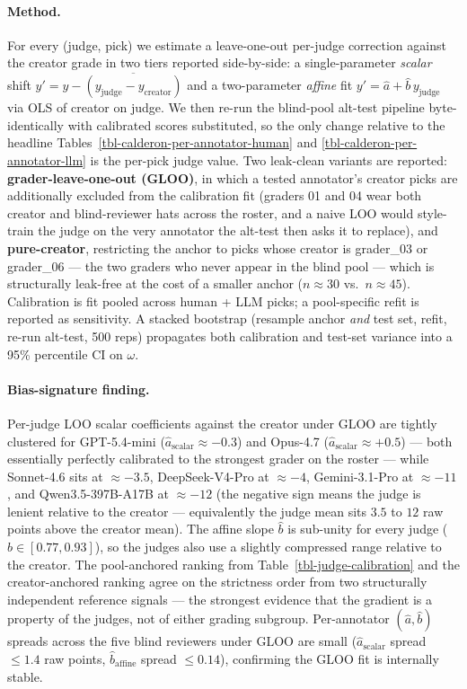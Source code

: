 \documentclass[11pt]{article}
\begin{document}
\paragraph{Method.} For every (judge, pick) we estimate a leave-one-out
per-judge correction against the creator grade in two tiers reported
side-by-side: a single-parameter \emph{scalar} shift
\(y' = y - \overline{(y_{\text{judge}} - y_{\text{creator}})}\) and a
two-parameter \emph{affine} fit
\(y' = \hat{a} + \hat{b}\,y_{\text{judge}}\) via OLS of creator on
judge. We then re-run the blind-pool alt-test pipeline byte-identically
with calibrated scores substituted, so the only change relative to the
headline Tables~\ref{tbl-calderon-per-annotator-human} and
\ref{tbl-calderon-per-annotator-llm} is the per-pick judge value. Two
leak-clean variants are reported: \textbf{grader-leave-one-out (GLOO)},
in which a tested annotator's creator picks are additionally excluded
from the calibration fit (graders 01 and 04 wear both creator and
blind-reviewer hats across the roster, and a naive LOO would style-train
the judge on the very annotator the alt-test then asks it to replace),
and \textbf{pure-creator}, restricting the anchor to picks whose creator
is grader\_03 or grader\_06 --- the two graders who never appear in the
blind pool --- which is structurally leak-free at the cost of a smaller
anchor (\(n \approx 30\) vs.~\(n \approx 45\)). Calibration is fit
pooled across human + LLM picks; a pool-specific refit is reported as
sensitivity. A stacked bootstrap (resample anchor \emph{and} test set,
refit, re-run alt-test, 500 reps) propagates both calibration and
test-set variance into a 95\% percentile CI on \(\omega\).

\paragraph{Bias-signature finding.} Per-judge LOO scalar coefficients
against the creator under GLOO are tightly clustered for GPT-5.4-mini
(\(\hat{a}_{\text{scalar}} \approx -0.3\)) and Opus-4.7
(\(\hat{a}_{\text{scalar}} \approx +0.5\)) --- both essentially
perfectly calibrated to the strongest grader on the roster --- while
Sonnet-4.6 sits at \(\approx -3.5\), DeepSeek-V4-Pro at \(\approx -4\),
Gemini-3.1-Pro at \(\approx -11\), and Qwen3.5-397B-A17B at
\(\approx -12\) (the negative sign means the judge is lenient relative
to the creator --- equivalently the judge mean sits \(3.5\) to \(12\)
raw points above the creator mean). The affine slope \(\hat{b}\) is
sub-unity for every judge (\(\hat{b} \in [0.77, 0.93]\)), so the judges
also use a slightly compressed range relative to the creator. The
pool-anchored ranking from Table~\ref{tbl-judge-calibration} and the
creator-anchored ranking agree on the strictness order from two
structurally independent reference signals --- the strongest evidence
that the gradient is a property of the judges, not of either grading
subgroup. Per-annotator \((\hat{a},\hat{b})\) spreads across the five
blind reviewers under GLOO are small (\(\hat{a}_{\text{scalar}}\) spread
\(\leq 1.4\) raw points, \(\hat{b}_{\text{affine}}\) spread
\(\leq 0.14\)), confirming the GLOO fit is internally stable.
\end{document}
